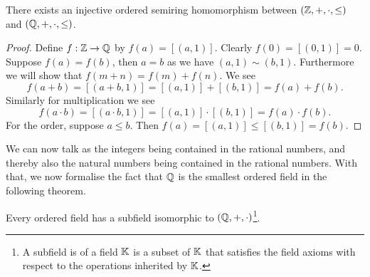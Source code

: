 \documentclass[../main.tex]{subfiles}
\begin{document}
\begin{proposition}\label{prp:the_natural_numbers_integers_and_rational_numbers:embedding_Z_in_Q}
    There exists an injective ordered semiring homomorphism between $(\mathbb{Z},+,\cdot,\leq)$ and $(\mathbb{Q},+,\cdot,\leq)$.
\end{proposition}
\begin{proof}
    Define $f:\mathbb{Z}\to\mathbb{Q}$ by $f(a)=[(a,1)]$. Clearly $f(0)=[(0,1)]=0$. Suppose $f(a)=f(b)$, then $a=b$ as we have $(a,1)\sim(b,1)$. Furthermore we will show that $f(m+n)=f(m)+f(n)$. We see
    \begin{equation*}
        f(a+b)=[(a+b,1)]=[(a,1)]+[(b,1)]=f(a)+f(b).
    \end{equation*}
    Similarly for multiplication we see
    \begin{equation*}
        f(a\cdot b)=[(a\cdot b,1)]=[(a,1)]\cdot[(b,1)]=f(a)\cdot f(b).
    \end{equation*}
    For the order, suppose $a\leq b$. Then $f(a)=[(a,1)]\leq[(b,1)]=f(b)$.
\end{proof}
We can now talk as the integers being contained in the rational numbers, and thereby also the natural numbers being contained in the rational numbers. With that, we now formalise the fact that $\mathbb{Q}$ is the smallest ordered field in the following theorem.
\begin{theorem}\label{thm:the_natural_numbers_integers_and_rational_numbers:Q_smallest_ordered_field}
    Every ordered field has a subfield isomorphic to $(\mathbb{Q},+,\cdot)$\footnote{A subfield is of a field $\mathbb{K}$ is a subset of $\mathbb{K}$ that satisfies the field axioms with respect to the operations inherited by $\mathbb{K}$.}.
\end{theorem}
\end{document}
